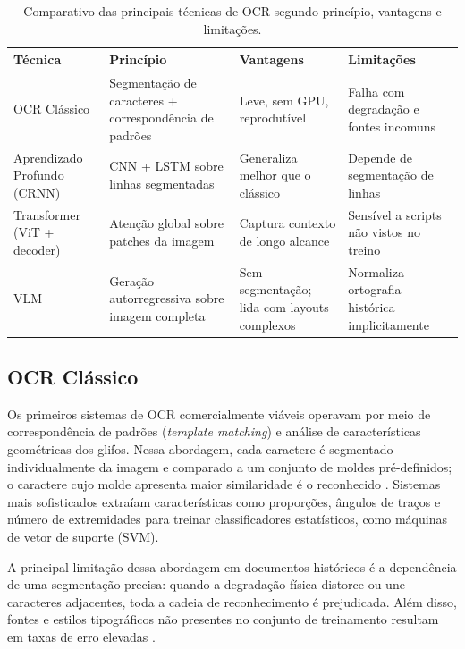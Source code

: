 \documentclass[
  12pt,
  oneside,
  a4paper,
  chapter=TITLE,
  section=TITLE,
  english,
  brazil
]{abntex2}
\begin{document}
\begin{table}[H]
\centering
\caption{Comparativo das principais técnicas de OCR segundo princípio, vantagens e
limitações.}
\label{tab:tecnicas_ocr}
\renewcommand{\arraystretch}{1.3}
\begin{tabular}{p{2.2cm} p{4cm} p{3.5cm} p{3.5cm}}
\hline
\textbf{Técnica} & \textbf{Princípio} & \textbf{Vantagens} & \textbf{Limitações} \\
\hline
OCR Clássico &
  Segmentação de caracteres + correspondência de padrões &
  Leve, sem GPU, reprodutível &
  Falha com degradação e fontes incomuns \\ \hline
Aprendizado Profundo (CRNN) &
  CNN + LSTM sobre linhas segmentadas &
  Generaliza melhor que o clássico &
  Depende de segmentação de linhas \\ \hline
Transformer (ViT + decoder) &
  Atenção global sobre patches da imagem &
  Captura contexto de longo alcance &
  Sensível a scripts não vistos no treino \\ \hline
VLM &
  Geração autorregressiva sobre imagem completa &
  Sem segmentação; lida com layouts complexos &
  Normaliza ortografia histórica implicitamente \\
\hline
\end{tabular}
\end{table}

\subsection{OCR Clássico}

Os primeiros sistemas de OCR comercialmente viáveis operavam por meio de correspondência
de padrões (\textit{template matching}) e análise de características geométricas dos
glifos. Nessa abordagem, cada caractere é segmentado individualmente da imagem e
comparado a um conjunto de moldes pré-definidos; o caractere cujo molde apresenta maior
similaridade é o reconhecido \cite{Incode2025}. Sistemas mais sofisticados extraíam
características como proporções, ângulos de traços e número de extremidades para treinar
classificadores estatísticos, como máquinas de vetor de suporte (SVM).

A principal limitação dessa abordagem em documentos históricos é a dependência de uma
segmentação precisa: quando a degradação física distorce ou une caracteres adjacentes,
toda a cadeia de reconhecimento é prejudicada. Além disso, fontes e estilos tipográficos
não presentes no conjunto de treinamento resultam em taxas de erro elevadas
\cite{lombardi2020}.
\end{document}
